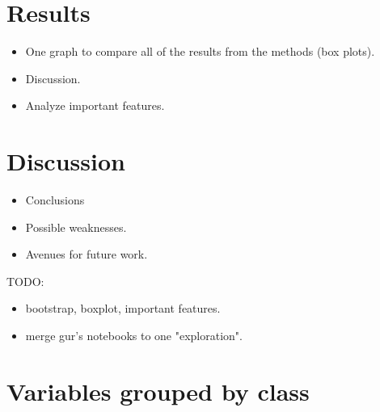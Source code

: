 \documentclass{article}
\begin{document}
\section{Results}

\begin{itemize}
    \item One graph to compare all of the results from the methods (box plots).
    \item Discussion.
    \item Analyze important features.
\end{itemize}

\section{Discussion}

\begin{itemize}
    \item Conclusions
    \item Possible weaknesses.
    \item Avenues for future work.
\end{itemize}


TODO:
\begin{itemize}
    \item bootstrap, boxplot, important features.
    \item merge gur's notebooks to one "exploration".
\end{itemize}



\appendix

\newpage
\section{Variables grouped by class}
\end{document}
